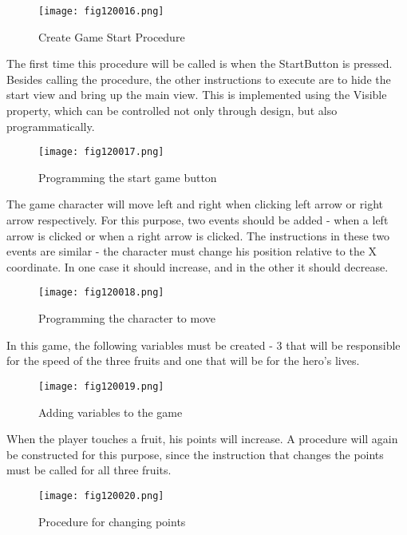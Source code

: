 \begin{figure}[H]
   \centering
   \texttt{[image: fig120016.png]}
   \caption{Create Game Start Procedure}
\label{fig120016}
\end{figure}

The first time this procedure will be called is when the StartButton is pressed. Besides calling the procedure, the other instructions to execute are to hide the start view and bring up the main view. This is implemented using the Visible property, which can be controlled not only through design, but also programmatically.

\begin{figure}[H]
   \centering
   \texttt{[image: fig120017.png]}
   \caption{Programming the start game button}
\label{fig120017}
\end{figure}

The game character will move left and right when clicking left arrow or right arrow respectively. For this purpose, two events should be added - when a left arrow is clicked or when a right arrow is clicked. The instructions in these two events are similar - the character must change his position relative to the X coordinate. In one case it should increase, and in the other it should decrease.

\begin{figure}[H]
   \centering
\texttt{[image: fig120018.png]}
   \caption{Programming the character to move}
\label{fig120018}
\end{figure}

In this game, the following variables must be created - 3 that will be responsible for the speed of the three fruits and one that will be for the hero's lives.

\begin{figure}[H]
   \centering
   \texttt{[image: fig120019.png]}
   \caption{Adding variables to the game}
\label{fig120019}
\end{figure}

When the player touches a fruit, his points will increase. A procedure will again be constructed for this purpose, since the instruction that changes the points must be called for all three fruits.

\begin{figure}[H]
   \centering
   \texttt{[image: fig120020.png]}
   \caption{Procedure for changing points}
\label{fig120020}
\end{figure}

